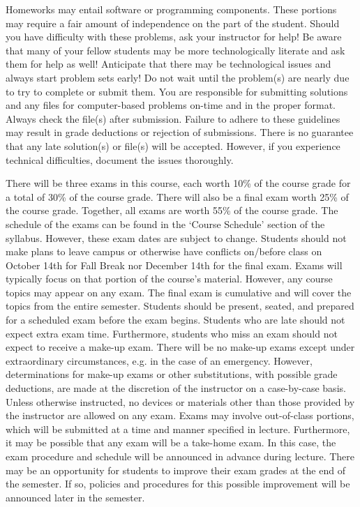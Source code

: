 \documentclass[11pt,letterpaper]{article}
\begin{document}
Homeworks may entail software or programming components. These portions may require a fair amount of independence on the part of the student. Should you have difficulty with these problems, ask your instructor for help! Be aware that many of your fellow students may be more technologically literate and ask them for help as well! Anticipate that there may be technological issues and always start problem sets early! Do not wait until the problem(s) are nearly due to try to complete or submit them. You are responsible for submitting solutions and any files for computer-based problems on-time and in the proper format. Always check the file(s) after submission. Failure to adhere to these guidelines may result in grade deductions or rejection of submissions. There is no guarantee that any late solution(s) or file(s) will be accepted. However, if you experience technical difficulties, document the issues thoroughly. 
\sectionbreak





\newpage






There will be three exams in this course, each worth 10\% of the course grade for a total of 30\% of the course grade. There will also be a final exam worth 25\% of the course grade. Together, all exams are worth 55\% of the course grade. The schedule of the exams can be found in the `Course Schedule' section of the syllabus. However, these exam dates are subject to change. Students should not make plans to leave campus or otherwise have conflicts on/before class on October 14th for Fall Break nor December 14th for the final exam. Exams will typically focus on that portion of the course's material. However, any course topics may appear on any exam. The final exam is cumulative and will cover the topics from the entire semester. Students should be present, seated, and prepared for a scheduled exam before the exam begins. Students who are late should not expect extra exam time. Furthermore, students who miss an exam should not expect to receive a make-up exam. There will be no make-up exams except under extraordinary circumstances, e.g. in the case of an emergency. However, determinations for make-up exams or other substitutions, with possible grade deductions, are made at the discretion of the instructor on a case-by-case basis. Unless otherwise instructed, no devices or materials other than those provided by the instructor are allowed on any exam. Exams may involve out-of-class portions, which will be submitted at a time and manner specified in lecture. Furthermore, it may be possible that any exam will be a take-home exam. In this case, the exam procedure and schedule will be announced in advance during lecture. There may be an opportunity for students to improve their exam grades at the end of the semester. If so, policies and procedures for this possible improvement will be announced later in the semester. 
\par\vspace{0.5cm}
\end{document}
